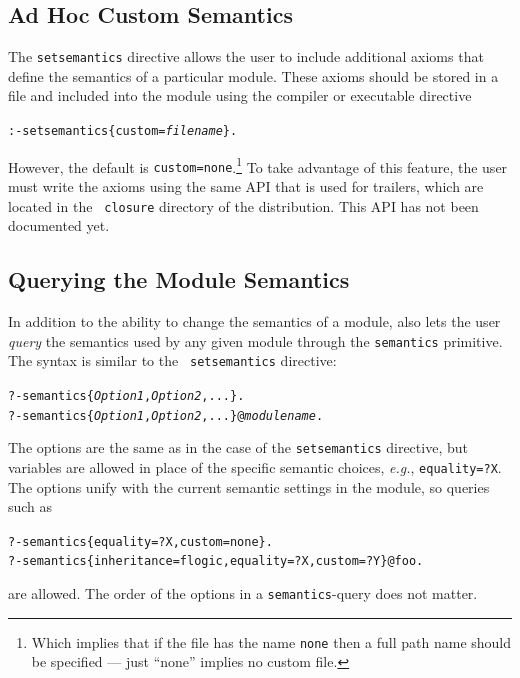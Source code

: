 \documentclass[11pt]{article}
\newcommand{\ERGO}{\mbox{\smaller{\ensuremath{\cal{E}}\smaller{{\sc{RGO}}}}}\xspace}
\newcommand{\FLSYSTEM}{\ERGO}
\begin{document}
\subsection{Ad Hoc Custom Semantics}\label{sec-ad-hoc-semantics}

The {\tt setsemantics} directive allows the user to include additional axioms
that define the semantics of a particular module. These axioms should be
stored in a file and included into the module using the compiler or
executable directive
\begin{alltt}
   :- setsemantics\{custom=\emph{filename}\}.  
\end{alltt}
However, the default is  {\tt custom=none}.\footnote{
  Which implies that if the file has the name {\tt none} then a full path
  name should be specified --- just ``none'' implies no custom file.
}
To take advantage of this feature, the user must write the axioms using the
same API that is used for \FLSYSTEM trailers, which are located in the {\tt
  closure} directory of the distribution. This API has not been documented
yet.

\subsection{Querying the Module Semantics}\label{sec-query-semantics}

In addition to the ability to change the semantics of a module, \FLSYSTEM also
lets the user \emph{query} the semantics used by any given module through
the {\tt semantics} primitive. The syntax is similar to the {\tt
  setsemantics} directive:
\begin{alltt}
   ?- semantics\{{\em Option1}, {\em Option2}, ...\}. 
   ?- semantics\{{\em Option1}, {\em Option2}, ...\}@\emph{modulename}.
\end{alltt}
The options are the same as in the case of the {\tt setsemantics}
directive, but variables are allowed in place of the specific semantic
choices, {\it e.g.}, {\tt equality=?X}. The options unify with the current
semantic settings in the module, so queries such as 
\begin{alltt}
   ?- semantics\{equality=?X, custom=none\}.
   ?- semantics\{inheritance=flogic, equality=?X, custom=?Y\}@foo.
\end{alltt}
are allowed. The order of the options in a {\tt semantics}-query does not
matter.
\end{document}
